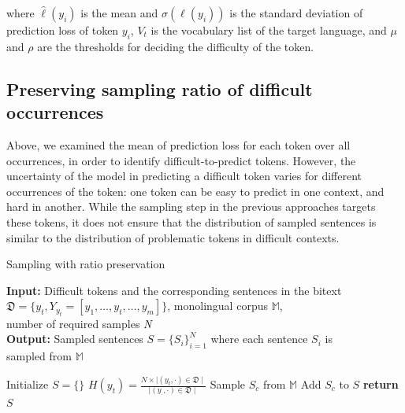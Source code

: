 \noindent where $\hat{\ell}(y_i)$ is the mean and $\sigma(\ell(y_i))$ is the standard deviation of prediction loss of token $y_i$, $V_t$ is the vocabulary list of the target language, and $\mu$ and $\rho$ are the thresholds for deciding the difficulty of the token.


 \subsection{Preserving sampling ratio of difficult occurrences}

Above, we examined the mean of prediction loss for each token over all occurrences, in order to identify difficult-to-predict tokens.
However, the uncertainty of the model in predicting a difficult token varies for different occurrences of the token: one token can be easy to predict in one context, and hard in another.
While the sampling step in the previous approaches targets these tokens, it does not ensure that the distribution of sampled sentences is similar to the distribution of problematic tokens in difficult contexts.

{\centering
\begin{minipage}{.85\linewidth}
\begin{algorithm}[H]
\caption{Sampling with ratio preservation}\label{alg2}
 \hspace*{\algorithmicindent} \textbf{Input:} Difficult tokens and the corresponding sentences in the bitext \\
  \hspace*{\algorithmicindent}  \textit{$\mathfrak{D}=\{y_t, Y_{y_t}=[y_1, \ldots, y_t, \ldots, y_m]\}$}, monolingual corpus \textit{$\mathbb{M}$}, \\
  \hspace*{\algorithmicindent} number of required samples \textit{N} \\
\hspace*{\algorithmicindent} \textbf{Output:} Sampled sentences $S=\{S_i\}_{i=1}^{N}$ where each sentence $S_i$ is \\
\hspace*{\algorithmicindent}  sampled from $\mathbb{M}$
 \begin{algorithmic}[1]
\State Initialize $S=\{\}$
\State $H(y_t) = \frac{ N \times \mid(y_t, \boldsymbol{\cdot})\in \mathfrak{D}\mid}{\mid(y_{\boldsymbol{\cdot}}, \boldsymbol{\cdot})\in \mathfrak{D}\mid}$
\Repeat
\State Sample $S_c$ from $\mathbb{M}$
	\State Add $S_c$ to $S$
\EndFor
{}
\State \textbf{return} $S$ %
\EndProcedure
\end{algorithmic}
\end{algorithm}
\end{minipage}
\par
}
\vspace{\baselineskip}%


